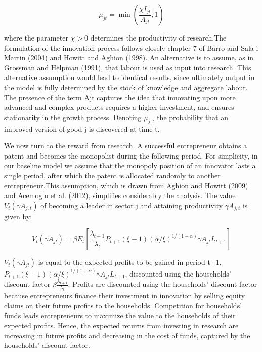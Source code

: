 \documentclass[cn,10pt,math=newtx,citestyle=gb7714-2015,bibstyle=gb7714-2015]{elegantbook}
\begin{document}
{{	\begin{equation}
		\mu_{j t}=\min \left(\frac{\chi I_{j t}}{A_{j t}}, 1\right)
	\end{equation}
	
	where the parameter $\chi>0$ determines the productivity of research.The formulation of the innovation process follows closely chapter 7 of Barro and Sala-i Martin (2004) and Howitt and Aghion (1998). An alternative is to assume, as in Grossman and Helpman (1991), that labour is used as input into research. This alternative assumption would lead to identical results, since ultimately output in the model is fully determined by the stock of knowledge and aggregate labour. The presence of the term Ajt captures the idea that innovating upon more advanced and complex products requires a higher investment, and ensures stationarity in the growth process. Denoting $\mu_{j,t}$ the probability that an improved version of good j is discovered at time t. 
	
	We now turn to the reward from research. A successful entrepreneur obtains a patent and becomes the monopolist during the following period. For simplicity, in our baseline model we assume that the monopoly position of an innovator lasts a single period, after which the patent is allocated randomly to another entrepreneur.This assumption, which is drawn from Aghion and Howitt (2009) and Acemoglu et al. (2012), simplifies considerably the analysis. The value $V_t (\gamma A_{j,t} )$ of becoming a leader in sector j and attaining productivity $\gamma A_{j,t}$ is given by:

\begin{equation}
	V_{t}\left(\gamma A_{j t}\right)=\beta E_{t}\left[\frac{\lambda_{t+1}}{\lambda_{t}} P_{t+1} (\xi-1)(\alpha / \xi)^{1 /(1-\alpha)} \gamma A_{j t} L_{t+1}\right]
\end{equation}

$V_{t}\left(\gamma A_{j t}\right)$ is equal to the expected profits to be gained in period t+1, $P_{t+1} (\xi-1)(\alpha / \xi)^{1 /(1-\alpha)} \gamma A_{j t} L_{t+1}$, discounted using the households’ discount factor $\beta \frac{\lambda_{t+1}}{\lambda_{t}}$. Profits are discounted using the households’ discount factor because entrepreneurs finance their investment in innovation by selling equity claims on their future profits to the households. Competition for households’ funds leads entrepreneurs to maximize the value to the households of their expected profits. Hence, the expected returns from investing in research are increasing in future profits and decreasing in the cost of funds, captured by the households’ discount factor.

}}
\end{document}
